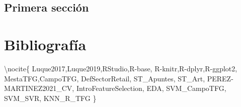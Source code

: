 \documentclass[12pt,a4paper,]{book}
\def\ifdoblecara{} %
\def\ifcitapandoc{} %
\let\ifcitapandoc\undefined %
\numberwithin{dummy}{section}
\theoremstyle{ocrenumbox}
\theoremstyle{blacknumex}
\theoremstyle{blacknumbox}
\theoremstyle{ocrenum}
\theoremstyle{ocrenum}
\begin{document}
\hypertarget{primera-secciuxf3n-1}{%
\section{Primera sección}\label{primera-secciuxf3n-1}}

\FloatBarrier
\cleardoublepage

\ifdefined\ifdoblecara
  \fancyhead[LE,RO]{}
  \fancyfoot[LO,RE]{}
\else
  \fancyhead[RO]{}
  \fancyfoot[LO]{}
\fi

\ifdefined\ifcitapandoc

\hypertarget{bibliografuxeda}{%
\chapter*{Bibliografía}\label{bibliografuxeda}}

\else

\textbackslash nocite\{ Luque2017,Luque2019,RStudio,R-base,
R-knitr,R-dplyr,R-ggplot2, MestaTFG,CampoTFG, DefSectorRetail,
ST\_Apuntes, ST\_Art, PEREZ-MARTINEZ2021\_CV, IntroFeatureSelection,
EDA, SVM\_CampoTFG, SVM\_SVR, KNN\_R\_TFG \}

\fi




\end{document}
